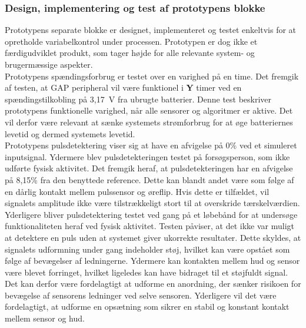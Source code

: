 \subsubsection{Design, implementering og test af prototypens blokke}
Prototypens separate blokke er designet, implementeret og testet enkeltvis for at opretholde variabelkontrol under processen. Prototypen er dog ikke et færdigudviklet produkt, som tager højde for alle relevante system- og brugermæssige aspekter.\\
Prototypens spændingsforbrug er testet over en varighed på en time. Det fremgik af testen, at GAP peripheral vil være funktionel i \textbf{Y} timer ved en spændingstilkobling på 3,17~V fra ubrugte batterier. Denne test beskriver prototypens funktionelle varighed, når alle sensorer og algoritmer er aktive. Det vil derfor være relevant at sænke systemets strømforbrug for at øge batteriernes levetid og dermed systemets levetid.\\
Prototypens pulsdetektering viser sig at have en afvigelse på 0\% ved et simuleret inputsignal. Ydermere blev pulsdetekteringen testet på forsøgsperson, som ikke udførte fysisk aktivitet. Det fremgik heraf, at pulsdetekteringen har en afvigelse på 8,15\% fra den benyttede reference. Dette kan blandt andet være som følge af en dårlig kontakt mellem pulssensor og øreflip. Hvis dette er tilfældet, vil signalets amplitude ikke være tilstrækkeligt stort til at overskride tærskelværdien. Yderligere bliver pulsdetektering testet ved gang på et løbebånd for at undersøge funktionaliteten heraf ved fysisk aktivitet. Testen påviser, at det ikke var muligt at detektere en puls uden at systemet giver ukorrekte resultater. Dette skyldes, at signalets udformning under gang indeholder støj, hvilket kan være opstået som følge af bevægelser af ledningerne. Ydermere kan kontakten mellem hud og sensor være blevet forringet, hvilket ligeledes kan have bidraget til et støjfuldt signal. Det kan derfor være fordelagtigt at udforme en anordning, der sænker risikoen for bevægelse af sensorens ledninger ved selve sensoren. Yderligere vil det være fordelagtigt, at udforme en opsætning som sikrer en stabil og konstant kontakt mellem sensor og hud.\\
